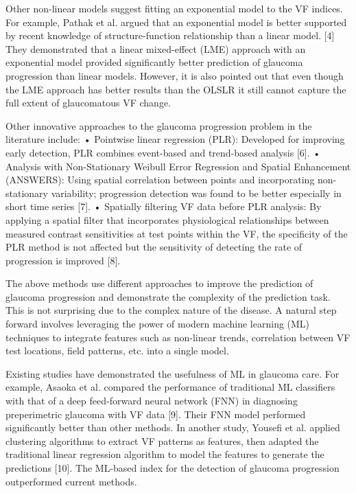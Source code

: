 Other non-linear models suggest fitting an exponential model to the VF indices. For example, Pathak et al. argued that an exponential model is better supported by recent knowledge of structure-function relationship than a linear model. [4] They demonstrated that a linear mixed-effect (LME) approach with an exponential model provided significantly better prediction of glaucoma progression than linear models. However, it is also pointed out that even though the LME approach has better results than the OLSLR it still cannot capture the full extent of glaucomatous VF change.

Other innovative approaches to the glaucoma progression problem in the literature include:
•	Pointwise linear regression (PLR): Developed for improving early detection, PLR combines event-based and trend-based analysis [6]. 
•	Analysis with Non-Stationary Weibull Error Regression and Spatial Enhancement (ANSWERS): Using spatial correlation between points and incorporating non-stationary variability; progression detection was found to be better especially in short time series [7].
•	Spatially filtering VF data before PLR analysis: By applying a spatial filter that incorporates physiological relationships between measured contrast sensitivities at test points within the VF, the specificity of the PLR method is not affected but the sensitivity of detecting the rate of progression is improved [8].

The above methods use different approaches to improve the prediction of glaucoma progression and demonstrate the complexity of the prediction task. This is not surprising due to the complex nature of the disease. A natural step forward involves leveraging the power of modern machine learning (ML) techniques to integrate features such as non-linear trends, correlation between VF test locations, field patterns, etc. into a single model.
 
Existing studies have demonstrated the usefulness of ML in glaucoma care. For example, Asaoka et al. compared the performance of traditional ML classifiers with that of a deep feed-forward neural network (FNN) in diagnosing preperimetric glaucoma with VF data [9]. Their FNN model performed significantly better than other methods. In another study, Yousefi et al. applied clustering algorithms to extract VF patterns as features, then adapted the traditional linear regression algorithm to model the features to generate the predictions [10]. The ML-based index for the detection of glaucoma progression outperformed current methods. 

